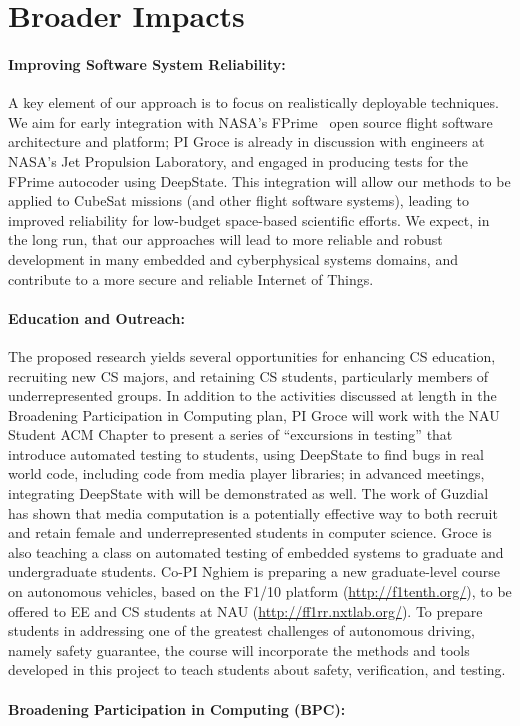 \section{Broader Impacts}

\paragraph{Improving Software System Reliability:} A key element of
our approach is to focus on realistically deployable techniques.  We aim
for early integration with NASA's FPrime~\cite{fprime,fprimerepo}
open source
flight software architecture and platform; PI Groce is already in
discussion with engineers at NASA's Jet Propulsion Laboratory, and
engaged in producing tests for the FPrime autocoder using DeepState.
This integration will allow our
methods to be applied to CubeSat missions (and other flight software
systems), leading to improved reliability for low-budget space-based
scientific efforts.  We expect, in the long run, that our approaches
will lead to more reliable and robust development in many embedded and
cyberphysical systems domains, and contribute to a more secure and
reliable Internet of Things.

\paragraph{Education and Outreach:}
The proposed research yields several opportunities for enhancing CS
education, recruiting new CS majors, and retaining CS students,
particularly members of underrepresented groups.  In addition to the
activities discussed at length in the Broadening Participation in Computing plan,
PI Groce will work with the NAU Student ACM Chapter to present a
series of ``excursions in testing'' that introduce automated testing
to students, using DeepState to find bugs in real world code, including code from
media player libraries; in advanced meetings, integrating DeepState
with \framac will be demonstrated as well.  The work of Guzdial
\cite{Guzdial} has shown that media computation is a
potentially effective way to both recruit and retain female and
underrepresented students in computer science. Groce is also teaching a
class on automated testing of embedded systems to graduate and
undergraduate students.
Co-PI Nghiem is preparing a new graduate-level course on autonomous
vehicles, based on the F1/10 platform (\url{http://f1tenth.org/}), to be offered to EE and CS students at NAU (\url{http://ff1rr.nxtlab.org/}).
To prepare students in addressing one of the greatest challenges of autonomous driving, namely safety guarantee, the course will incorporate the methods and tools developed in this project to teach students about safety, verification, and testing.

\paragraph{Broadening Participation in Computing (BPC):}



